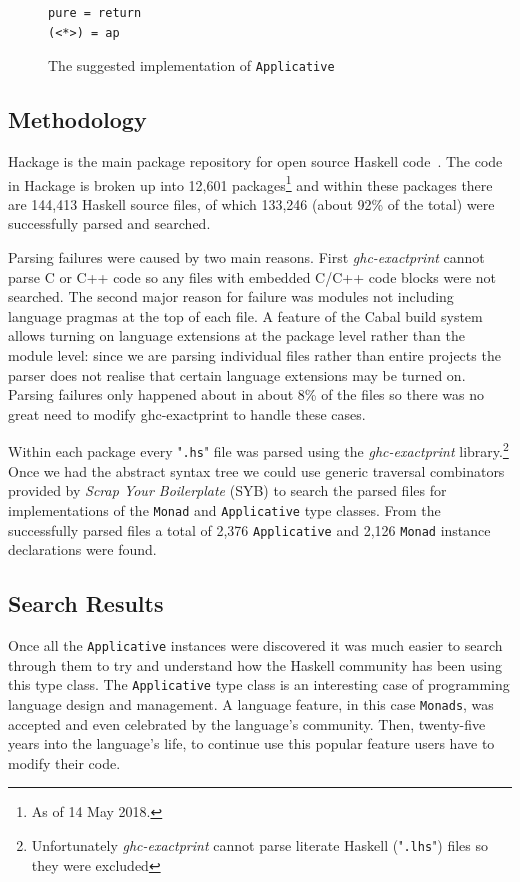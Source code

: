 \begin{figure}[t]
\begin{lstlisting}
pure = return
(<*>) = ap
\end{lstlisting}
\caption{The suggested implementation of \texttt{Applicative}}
\label{appSugImp}
\end{figure}

\subsection{Methodology}

Hackage is the main package repository for open source Haskell code~\citep{hackage}. The code in Hackage is broken up into 12,601 packages\footnote{As of 14 May 2018.} and within these packages there are 144,413 Haskell source files, of which 133,246 (about 92\% of the total) were successfully parsed and searched. 

Parsing failures were caused by two main reasons. First \textit{ghc-exactprint} cannot parse C or C++ code so any files with  embedded C/C++ code blocks were not searched. The second major reason for failure was modules not including language pragmas at the top of each file. A feature of the Cabal build system allows turning on language extensions at the package level rather than the module level: since we are parsing individual files rather than entire projects the parser does not realise that certain language extensions may be turned on. Parsing failures only happened about in about 8\% of the files so there was no great need to modify ghc-exactprint to handle these cases.

Within each package every "\texttt{.hs}" file was parsed using the \textit{ghc-exactprint} library.\footnote{Unfortunately \textit{ghc-exactprint} cannot parse literate Haskell ("\texttt{.lhs}") files so they were excluded} Once we had the abstract syntax tree we could use generic traversal combinators provided by \textit{Scrap Your Boilerplate} (SYB) to search the parsed files for implementations of the \texttt{Monad} and \texttt{Applicative} type classes. From the successfully parsed files a total of 2,376 \texttt{Applicative} and 2,126 \texttt{Monad} instance declarations were found.

\subsection{Search Results}

Once all the \texttt{Applicative} instances were discovered it was much easier to search through them to try and understand how the Haskell community has been using this type class. The \texttt{Applicative} type class is an interesting case of programming language design and management. A language feature, in this case \texttt{Monads}, was accepted and even celebrated by the language's community. Then, twenty-five years into the language's life, to continue use this popular feature users have to modify their code. 

